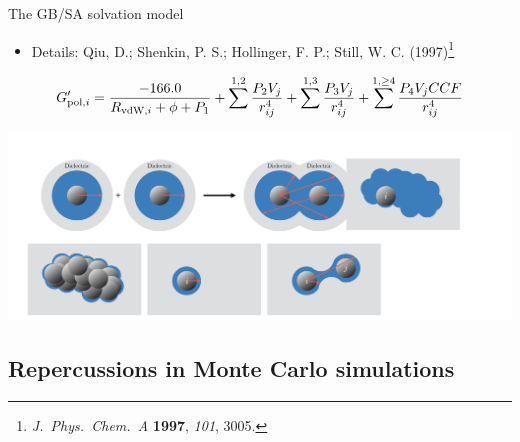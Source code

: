 \documentclass[10pt]{beamer}
\begin{document}
\begin{frame}[t]{The GB/SA solvation model}

\begin{itemize}
    \item Details: Qiu, D.; Shenkin, P. S.; Hollinger, F. P.; Still, W. C. (1997)\footnote{\textit{J.\ Phys.\ Chem.\ A} \textbf{1997}, \textit{101}, 3005.}
\end{itemize}

\vspace*{5mm}
\begin{equation*}
G^\prime_{\textnormal{pol},i} = \frac{-166.0}{R_{\textnormal{vdW},i}+\phi+P_1} + \sum^{1,2}\frac{P_2V_j}{r^4_{ij}} + \sum^{1,3}\frac{P_3V_j}{r^4_{ij}} + \sum^{1,\ge 4}\frac{P_4V_jCCF}{r^4_{ij}}
\end{equation*}

\vspace*{5mm}
\begin{center}
\includegraphics[scale=0.22]{figures/pdf/gpoli.pdf}
\end{center}
\end{frame}


\subsection{Repercussions in Monte Carlo simulations}

\end{document}

